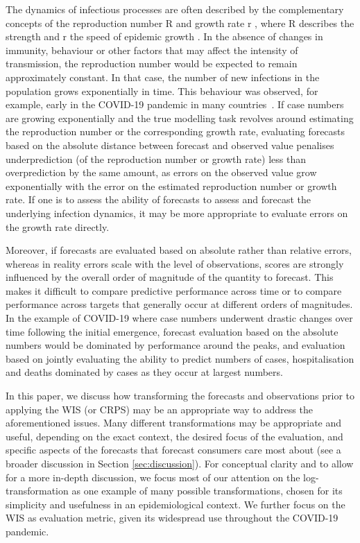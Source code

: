 \documentclass{article}
\begin{document}
The dynamics of infectious processes are often described by the complementary concepts of the reproduction number R \citep{gosticPracticalConsiderationsMeasuring2020} and growth rate r \citep{wallingaHowGenerationIntervals2007}, where R describes the strength and r the speed of epidemic growth \citep{dushoffSpeedStrengthEpidemic2021}.
In the absence of changes in immunity, behaviour or other factors that may affect the intensity of transmission, the reproduction number would be expected to remain approximately constant.
In that case, the number of new infections in the population grows exponentially in time.
This behaviour was observed, for example, early in the COVID-19 pandemic in many countries~\citep{pellisChallengesControlCOVID192021}.
If case numbers are growing exponentially and the true modelling task revolves around estimating the reproduction number or the corresponding growth rate, evaluating forecasts based on the absolute distance between forecast and observed value penalises underprediction (of the reproduction number or growth rate) less than overprediction by the same amount, as errors on the observed value grow exponentially with the error on the estimated reproduction number or growth rate.
If one is to assess the ability of forecasts to assess and forecast the underlying infection dynamics, it may be more appropriate to evaluate errors on the growth rate directly.

Moreover, if forecasts are evaluated based on absolute rather than relative errors, whereas in reality errors scale with the level of observations, scores are strongly influenced by the overall order of magnitude of the quantity to forecast.
This makes it difficult to compare predictive performance across time or to compare performance across targets that generally occur at different orders of magnitudes.
In the example of COVID-19 where case numbers underwent drastic changes over time following the initial emergence, forecast evaluation based on the absolute numbers would be dominated by performance around the peaks, and evaluation based on jointly evaluating the ability to predict numbers of cases, hospitalisation and deaths dominated by cases as they occur at largest numbers.

In this paper, we discuss how transforming the forecasts and observations prior to applying the WIS (or CRPS) may be an appropriate way to address the aforementioned issues. Many different transformations may be appropriate and useful, depending on the exact context, the desired focus of the evaluation, and specific aspects of the forecasts that forecast consumers care most about (see a broader discussion in Section \ref{sec:discussion}). For conceptual clarity and to allow for a more in-depth discussion, we focus most of our attention on the log-transformation as one example of many possible transformations, chosen for its simplicity and usefulness in an epidemiological context. We further focus on the WIS as evaluation metric, given its widespread use throughout the COVID-19 pandemic. 
\end{document}
